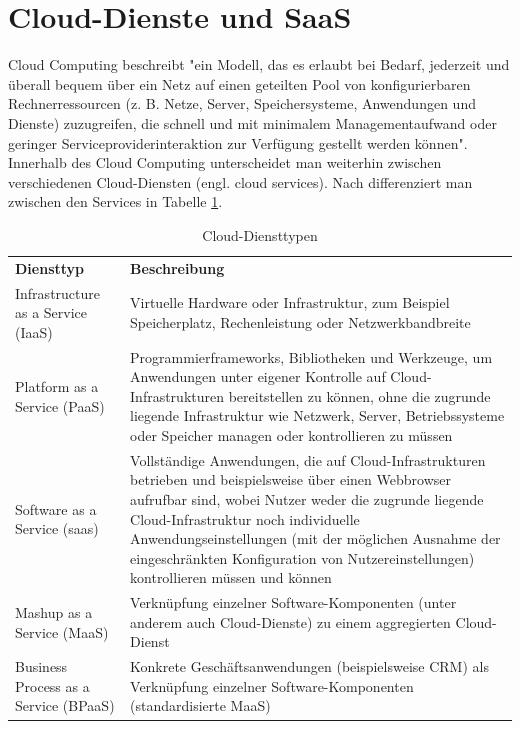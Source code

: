 \section{Cloud-Dienste und SaaS}\label{sec:SaaS}
Cloud Computing beschreibt "ein Modell, das es erlaubt bei Bedarf, jederzeit und überall bequem über ein Netz auf einen geteilten Pool von konfigurierbaren Rechnerressourcen (z. B. Netze, Server, Speichersysteme, Anwendungen und Dienste) zuzugreifen, die schnell und mit minimalem Managementaufwand oder geringer Serviceproviderinteraktion zur Verfügung gestellt werden können"\citep[S.~18]{appelrath_future_2014-1}. Innerhalb des Cloud Computing unterscheidet man weiterhin zwischen verschiedenen Cloud-Diensten (engl. cloud services). Nach \citep[S.~20]{appelrath_future_2014-1} differenziert man zwischen den Services in Tabelle \ref{tab:CloudServices}.
\begin{table}[H]
\begin{tabular}{|p{5cm}|p{10cm}|}
\hline
\textbf{Diensttyp} & \textbf{Beschreibung}\\
\hhline{==}
Infrastructure as a Service (IaaS) & Virtuelle Hardware oder Infrastruktur, zum Beispiel Speicherplatz, Rechenleistung oder Netzwerkbandbreite\\
\hline
Platform as a Service (PaaS) & Programmierframeworks, Bibliotheken und Werkzeuge, um Anwendungen unter eigener Kontrolle auf
Cloud-Infrastrukturen bereitstellen zu können, ohne die zugrunde liegende Infrastruktur wie Netzwerk,
Server, Betriebssysteme oder Speicher managen oder kontrollieren zu müssen\\
\hline
Software as a Service (\gls{saas}) & Vollständige Anwendungen, die auf Cloud-Infrastrukturen betrieben und beispielsweise über einen
Webbrowser aufrufbar sind, wobei Nutzer weder die zugrunde liegende Cloud-Infrastruktur noch
individuelle Anwendungseinstellungen (mit der möglichen Ausnahme der eingeschränkten Konfiguration
von Nutzereinstellungen) kontrollieren müssen und können\\
\hline
Mashup as a Service (MaaS) & Verknüpfung einzelner Software-Komponenten (unter anderem auch Cloud-Dienste) zu einem aggregierten
Cloud-Dienst\\
\hline
Business Process as a Service (BPaaS) & Konkrete Geschäftsanwendungen (beispielsweise CRM) als Verknüpfung einzelner Software-Komponenten
(standardisierte MaaS)\\
\hline
\end{tabular}
\caption{Cloud-Diensttypen}
\label{tab:CloudServices}
\end{table}
